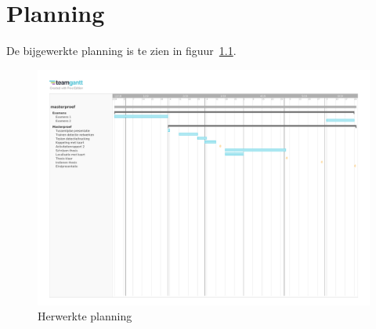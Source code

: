  
\chapter{Planning}

De bijgewerkte planning is te zien in figuur~\ref{fig:planning}.

\begin{figure}
    \includegraphics[width=1.1\paperwidth,angle=90]{bijlagen/planning.pdf}
    \caption{Herwerkte planning} \label{fig:planning}
\end{figure}
